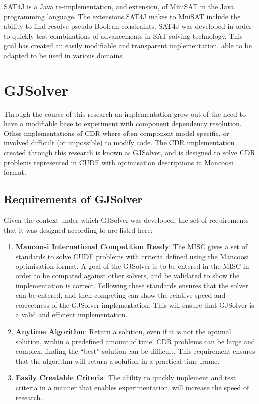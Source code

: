 SAT4J \citep{le2010sat4j} is a Java re-implementation, and extension, of MiniSAT in the Java programming language.
The extensions SAT4J makes to MniSAT include the ability to find resolve pseudo-Boolean constraints.
SAT4J was developed in order to quickly test combinations of advancements in SAT solving technology.
This goal has created an easily modifiable and transparent implementation, able to be adapted to be used in various domains.

\section{GJSolver}
\label{impl.gjsolver}
Through the course of this research an implementation grew out of the need to have a modifiable base to experiment with component dependency resolution.
Other implementations of CDR where often component model specific, or involved difficult (or impossible) to modify code.
The CDR implementation created through this research is known as GJSolver, 
and is designed to solve CDR problems represented in CUDF with optimisation descriptions in Mancoosi format.

\subsection{Requirements of GJSolver}

Given the context under which GJSolver was developed, the set of requirements that it was designed according to are listed here:
\begin{enumerate}
  \item \textbf{Mancoosi International Competition Ready}: The MISC gives a set of standards to solve CUDF problems with criteria defined using the Mancoosi optimisation format.
  A goal of the GJSolver is to be entered in the MISC in order to be compared against other solvers, and be validated to show the implementation is correct.
  Following these standards ensures that the solver can be entered, and then competing can show the relative speed and correctness of the GJSolver implementation.
  This will ensure that GJSolver is a valid and efficient implementation. 
  \item \textbf{Anytime Algorithm}: Return a solution, even if it is not the optimal solution, within a predefined amount of time. 
  CDR problems can be large and complex, finding the ``best'' solution can be difficult. 
  This requirement ensures that the algorithm will return a solution in a practical time frame.
  \item \textbf{Easily Creatable Criteria}: The ability to quickly implement and test criteria in a manner that enables experimentation, will increase the speed of research.
\end{enumerate}


